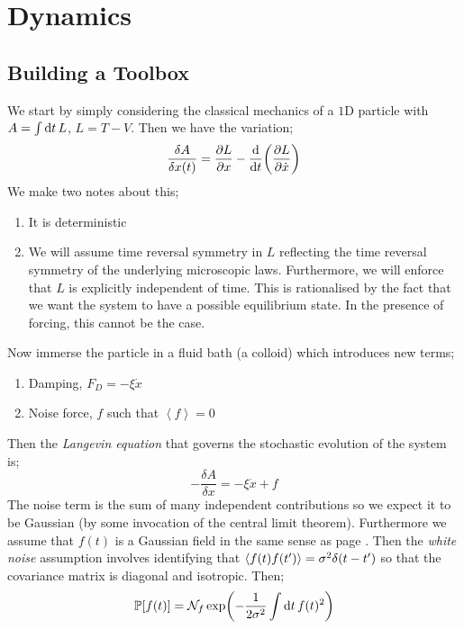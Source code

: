 \section{Dynamics}
\subsection{Building a Toolbox}
We start by simply considering the classical mechanics of a $1$D particle with $A = \int{\text{d}t \,L}$, $L = T - V$. Then we have the variation;
\begin{equation*}
\frac{\delta A}{\delta x(t)} = \frac{\del L}{\del x} - \frac{\ud}{\ud t}\left(\frac{\del L}{\del \dot{x}}\right)
\end{equation*}
We make two notes about this;
\begin{enumerate}
\item It is deterministic
\item We will assume time reversal symmetry in $L$ reflecting the time reversal symmetry of the underlying microscopic laws. Furthermore, we will enforce that $L$ is explicitly independent of time. This is rationalised by the fact that we want the system to have a possible equilibrium state. In the presence of forcing, this cannot be the case.
\end{enumerate}
Now immerse the particle in a fluid bath (a colloid) which introduces new terms;
\begin{enumerate}
\item Damping, $F_D = -\xi \dot{x}$
\item Noise force, $f$ such that $\left< f \right> = 0$
\end{enumerate}
Then the \emph{Langevin equation} that governs the stochastic evolution of the system is;
\begin{equation}
-\frac{\delta A}{\delta x} = - \xi \dot{x} + f
\end{equation}
The noise term is the sum of many independent contributions so we expect it to be Gaussian (by some invocation of the central limit theorem). Furthermore we assume that $f(t)$ is a Gaussian field in the same sense as page \pageref{sec:grf}. Then the \emph{white noise} assumption involves identifying that $\left< f(t) f(t\pr) \right> = \sigma^2 \delta(t - t\pr)$ so that the covariance matrix is diagonal and isotropic. Then;
\begin{equation}
\mathbb{P}\left[f(t)\right] = \mathcal{N}_f \exp\left(-\frac{1}{2\sigma^2}\int{\upd{t}f(t)^2}\right)
\end{equation} 
